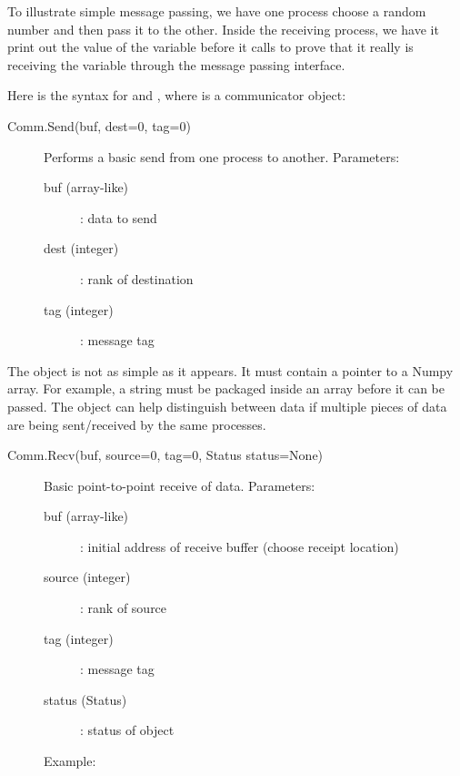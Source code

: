 

To illustrate simple message passing, we have one process choose a random number and then pass it to the other.
Inside the receiving process, we have it print out the value of the variable  before it calls  to prove that it really is receiving the variable through the message passing interface.

Here is the syntax for  and , where  is a communicator object:

\begin{description}
\item[Comm.Send(buf, dest=0, tag=0)]
Performs a basic send from one process to another.
Parameters:
\begin{description}
\item[buf (array-like)]: data to send
\item[dest (integer)]: rank of destination
\item[tag (integer)]: message tag
\end{description}
\end{description}

The  object is not as simple as it appears. It must contain a pointer to a Numpy array. 
For example, a string must be packaged inside an array before it can be passed.
The  object can help distinguish between data if multiple pieces of data are being sent/received by the same processes.

\begin{description}
\item[Comm.Recv(buf, source=0, tag=0, Status status=None)]
Basic point-to-point receive of data.
Parameters:
\begin{description}
\item[buf (array-like)]: initial address of receive buffer (choose receipt location)
\item[source (integer)]: rank of source
\item[tag (integer)]: message tag
\item[status (Status)]: status of object
\end{description}
Example:

\end{description}

